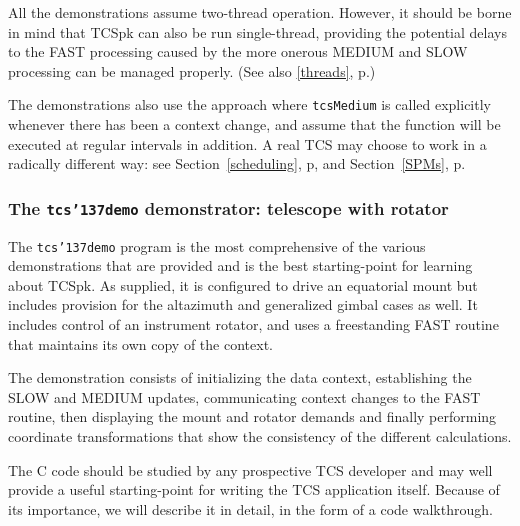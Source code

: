 \documentclass[12pt,fleqn,twoside]{article}
\renewcommand{\_}{{\tt\char'137}}     %
\begin{document}
All the demonstrations assume two-thread operation.  However, it should
be borne in mind that TCSpk can also be run single-thread, providing
the potential delays to the FAST processing caused by the more
onerous MEDIUM and SLOW processing can be managed properly.  (See also
\ref{threads}, p\pageref{threads}.)

The demonstrations also use the approach where {\tt tcsMedium} is
called explicitly whenever there has been a context change, and
assume that the function will be executed at regular intervals
in addition.  A real TCS may choose to work in a radically
different way: see Section~\ref{scheduling}, p\pageref{scheduling}, and
Section~\ref{SPMs}, p\pageref{SPMs}.


\newpage
\subsubsection{The {\tt tcs\_demo} demonstrator: telescope with rotator}
\label{tcs_demo}

The {\tt tcs\_demo} program is the most comprehensive of the various
demonstrations that are provided and is the best starting-point for
learning about TCSpk.  As supplied, it is configured to drive an
equatorial mount but includes provision for the altazimuth and
generalized gimbal cases as well.  It includes control of an
instrument rotator, and uses a freestanding FAST routine that
maintains its own copy of the context.

The demonstration consists of initializing the data context,
establishing the SLOW and MEDIUM updates, communicating context
changes to the FAST routine, then displaying the mount and
rotator demands and finally performing coordinate transformations
that show the consistency of the different calculations.

The C code should be studied by any prospective TCS
developer and may well provide a useful starting-point for writing the
TCS application itself.  Because of its importance, we will describe
it in detail, in the form of a code walkthrough.
\end{document}
